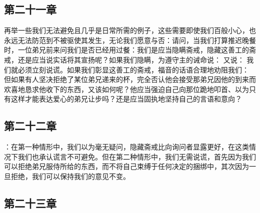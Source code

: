 
\subsection{第二十一章}

\par

再举一些我们无法避免且几乎是日常所需的例子，这些需要即使我们百般小心，也永远无法防范到不被驱使其发生，无论我们愿意与否：请问，当我们打算推迟晚餐时，一位弟兄前来问我们是否已经用过餐：我们是应当隐瞒斋戒，隐藏这善工的斋戒，还是应当说实话将其宣扬呢？如果我们隐瞒，为遵守主的诫命说： 又说： 我们就必须立刻说谎。如果我们彰显这善工的斋戒，福音的话语合理地劝阻我们： 但如果有人坚决拒绝了某位弟兄递来的杯，完全否认他会接受那弟兄因他的到来而欢喜地恳求他收下的东西，又该如何呢？他应当强迫自己向那位跪地叩首、以为只有这样才能表达爱心的弟兄让步吗？还是应当固执地坚持自己的言语和意向？\par


\subsection{第二十二章}

\par

：在第一种情形中，我们以为毫无疑问，隐藏斋戒比向询问者显露更好，在这类情况下我们也承认谎言不可避免。但在第二种情形中，我们无需说谎，首先因为我们可以拒绝弟兄服侍所给的东西，而不将自己束缚于任何决定的捆绑中，其次因为一旦拒绝，我们可以保持我们的意见不变。\par


\subsection{第二十三章}

\par

